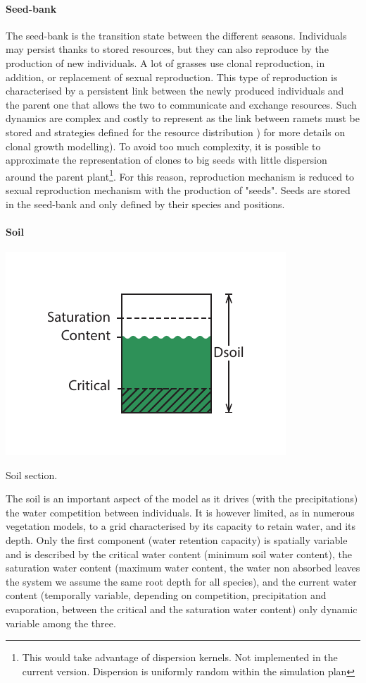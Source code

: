 \paragraph{Seed-bank} The seed-bank is the transition state between the different seasons. Individuals may persist thanks to stored resources, but they can also reproduce by the production of new individuals. A lot of grasses use clonal reproduction, in addition, or replacement of sexual reproduction. This type of reproduction is characterised by a persistent link between the newly produced individuals and the parent one that allows the two to communicate and exchange resources. Such dynamics are complex and costly to represent as the link between ramets must be stored and strategies defined for the resource distribution \parencite{soussana_gemini:_2012}) for more details on clonal growth modelling). To avoid too much complexity, it is possible to approximate the representation of clones to big seeds with little dispersion around the parent plant\footnote{This would take advantage of dispersion kernels. Not implemented in the current version. Dispersion is uniformly random within the simulation plan}. For this reason, reproduction mechanism is reduced to sexual reproduction mechanism with the production of "seeds". Seeds are stored in the seed-bank and only defined by their species and positions. 

\paragraph{Soil}
\begin{marginfigure}
\includegraphics{./Figures/soil_section_m.pdf}
\caption{Soil section.}
\end{marginfigure}
The soil is an important aspect of the model as it drives (with the precipitations) the water competition between individuals. It is however limited, as in numerous vegetation models, to a grid characterised by its capacity to retain water, and its depth. Only the first component (water retention capacity) is spatially variable and is described by the critical water content (minimum soil water content), the saturation water content (maximum water content, the water non absorbed leaves the system we assume the same root depth for all species), and the current water content (temporally variable, depending on competition, precipitation and evaporation, between the critical and the saturation water content) only dynamic variable among the three.

